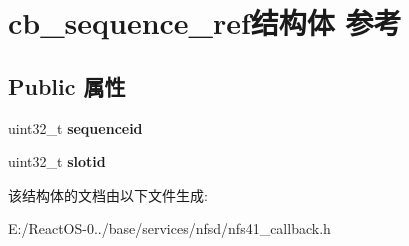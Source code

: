 \hypertarget{structcb__sequence__ref}{}\section{cb\+\_\+sequence\+\_\+ref结构体 参考}
\label{structcb__sequence__ref}
\subsection*{Public 属性}
\begin{DoxyCompactItemize}
\item 
\mbox{\label{structcb__sequence__ref_aeba52c44c3af11fb572abcc4356ebf76}} 
uint32\+\_\+t {\bfseries sequenceid}
\item 
\mbox{\label{structcb__sequence__ref_a7116eb64bb2c4452926f3c45e3da163b}} 
uint32\+\_\+t {\bfseries slotid}
\end{DoxyCompactItemize}


该结构体的文档由以下文件生成\+:\begin{DoxyCompactItemize}
\item 
E\+:/\+React\+O\+S-\/0../base/services/nfsd/nfs41\+\_\+callback.\+h\end{DoxyCompactItemize}
